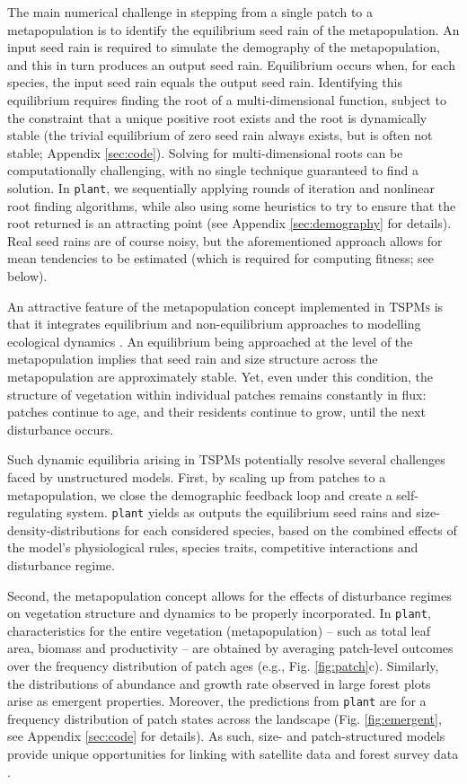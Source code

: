 \documentclass[a4paper,11pt]{article}
\newcommand{\plant}{\texttt{plant}}
\begin{document}
The main numerical challenge in stepping from a single patch to a
metapopulation is to identify the equilibrium seed rain of the
metapopulation. An input seed rain is required to simulate the
demography of the metapopulation, and this in turn produces an output
seed rain. Equilibrium occurs when, for each species,
the input seed rain equals the output seed rain. Identifying this equilibrium
requires finding the root of a multi-dimensional function, subject to
the constraint that a unique positive root exists and the root is dynamically stable (the trivial equilibrium
of zero seed rain always exists, but is often not stable; Appendix
\ref{sec:code}). Solving for multi-dimensional roots can be computationally challenging,
with no single technique guaranteed to find a solution. In {\plant}, we sequentially
applying rounds of iteration and nonlinear root finding algorithms, while also
using some heuristics to try to ensure that the root returned is an attracting point
(see Appendix \ref{sec:demography} for details). Real seed rains are of course noisy,
but the aforementioned approach allows for mean tendencies to be estimated (which is required for computing fitness; see below).

An attractive feature of the metapopulation concept implemented in \textsc{TSPMs}
is that it integrates equilibrium and non-equilibrium approaches to
modelling ecological dynamics \citep{Kohyama-1993, Moorcroft-2001,
 Falster-2011}. An equilibrium being approached at the level of
the metapopulation implies that seed rain and size structure across the
metapopulation are approximately stable. Yet, even under this condition, the structure of
vegetation within individual patches remains constantly in flux: patches
continue to age, and their residents continue to grow, until the next disturbance occurs.

Such dynamic equilibria arising in \textsc{TSPMs} potentially resolve several
challenges faced by unstructured models. First, by scaling up from
patches to a metapopulation, we close the demographic feedback loop and
create a self-regulating system. {\plant} yields as outputs the equilibrium seed rains and size-density-distributions for each considered species, based on the combined effects of the model's physiological rules, species traits, competitive interactions
and disturbance regime.

Second, the metapopulation concept allows for the effects of disturbance
regimes on vegetation structure and dynamics to be properly incorporated. In
{\plant}, characteristics for the entire vegetation (metapopulation) -- such
as total leaf area, biomass and productivity -- are obtained by averaging
patch-level outcomes over the frequency distribution of patch ages (e.g.,
Fig. \ref{fig:patch}c). Similarly, the distributions of abundance and growth rate
observed in large forest plots \citep[e.g.,][]{Muller-2006, Coomes-2007} arise
as emergent properties. Moreover, the predictions from {\plant}
are for a frequency distribution of patch states across the landscape
(Fig. \ref{fig:emergent}, see Appendix \ref{sec:code} for details). As such,
size- and patch-structured models provide unique opportunities for linking with
satellite data and forest survey data \citep{Moorcroft-2001, Purves-2008}.
\end{document}
